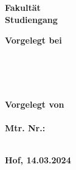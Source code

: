 \begin{titlepage} %
	
	\center %
	
	
	\textbf{\Large \mytitle}\\[0.5cm]
	\textbf{\large \mysubtitle}\\[0.5cm]

  \vspace{3cm}

  \textbf{\Large \textls{\mydoctype}}\\[0.8cm]
	
  \textbf{\myuniname{}\\
  Fakultät \myfaculty{}\\
  Studiengang \mycourse{}}\\[0.5cm]
	
  \vfill\vfill\vfill

	\begin{minipage}{0.4\textwidth}
		\begin{flushleft}
			\textbf{Vorgelegt bei\\
      \mydocent{}\\
      \myunistreet{} \myuninumber{}\\
      \myunizip{} \myuniplace{}
      }
		\end{flushleft}
	\end{minipage}
	~
	\begin{minipage}{0.4\textwidth}
		\begin{flushright}
			\textbf{
      Vorgelegt von\\
      \myname{}\\
      Mtr. Nr.: \mymatrnr{}\\
      \mystreet{} \mynumber{}\\
      \myzip{} \myplace{}
      }
		\end{flushright}
	\end{minipage}
	
  \vfill

	
	\textbf{Hof, 14.03.2024} %
	
	
\end{titlepage}
\restoregeometry
